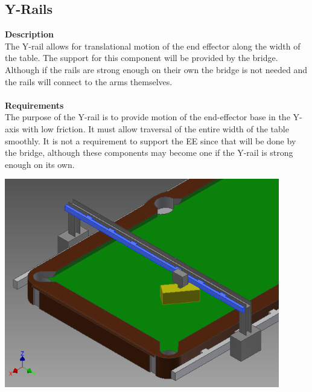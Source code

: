 \documentclass[titlepage]{article}
\begin{document}
\subsection{Y-Rails}
\textbf{Description}\\
The Y-rail allows for translational motion of the end effector along the width of the table. The support for this component will be provided by the bridge. Although if the rails are strong enough on their own the bridge is not needed and the rails will connect to the arms themselves.\\\\
\textbf{Requirements}\\
The purpose of the Y-rail is to provide motion of the end-effector base in the Y-axis with low friction. It must allow traversal of the entire width of the table smoothly. It is not a requirement to support the EE since that will be done by the bridge, although these components may become one if the Y-rail is strong enough on its own.
\begin{center}
	\includegraphics[width = 0.9\textwidth]{yRail1.png}
\label{fig:yRailFig}
\end{center}

\newpage
\end{document}
